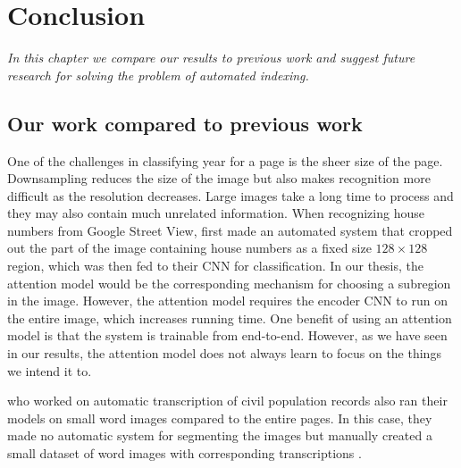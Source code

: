 \chapter{Conclusion}

\textit{In this chapter we compare our results to previous work and suggest future research for solving the problem of automated indexing.}

%
%


\section{Our work compared to previous work}


One of the challenges in classifying year for a page is the sheer size of the page. Downsampling reduces the size of the image but also makes recognition more difficult as the resolution decreases. Large images take a long time to process and they may also contain much unrelated information. When recognizing house numbers from Google Street View, \textcite{multidigit_streetview} first made an automated system that cropped out the part of the image containing house numbers as a fixed size $128 \times 128$ region, which was then fed to their CNN for classification. In our thesis, the attention model would be the corresponding mechanism for choosing a subregion in the image. However, the attention model requires the encoder CNN to run on the entire image, which increases running time.
One benefit of using an attention model is that the system is trainable from end-to-end.
However, as we have seen in our results, the attention model does not always learn to focus on the things we intend it to.





\textcite{FornesCnnCategorization} who worked on automatic transcription of civil population records also ran their models on small word images compared to the entire pages. In this case, they made no automatic system for segmenting the images but manually created a small dataset of word images with corresponding transcriptions \cite{esposalles}.

